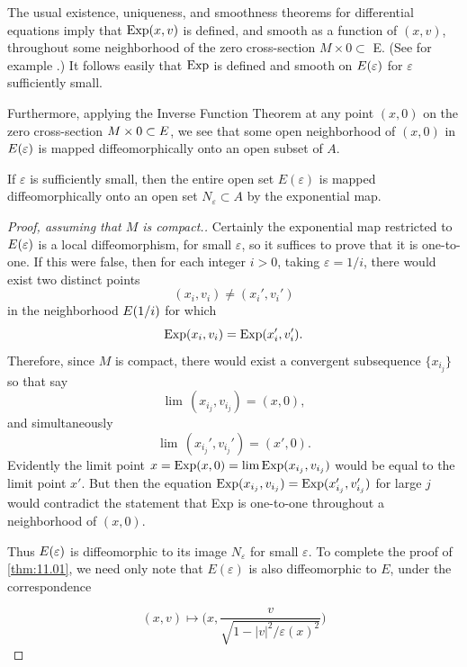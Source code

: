 \documentclass[../main]{subfiles}
\begin{document}
The usual existence, uniqueness, and smoothness theorems for differential equations imply that $\operatorname{Exp}(x, v)$ is defined, and smooth as a function of $(x, v)$, throughout some neighborhood of the zero cross-section $M \times 0 \subset$ E. (See for example \cite{bishop2011}.) It follows easily that $\operatorname{Exp}$ is defined and smooth on $E(\varepsilon)$ for $\varepsilon$ sufficiently small.

Furthermore, applying the Inverse Function Theorem at any point $(x, 0)$ on the zero cross-section $M \times 0 \subset E$, we see that some open neighborhood of $(x, 0)$ in $E(\varepsilon)$ is mapped diffeomorphically onto an open subset of $A$.


\begin{assertion*} If $\varepsilon$ is sufficiently small, then the entire open set $E(\varepsilon)$ is mapped diffeomorphically onto an open set $N_{\varepsilon} \subset A$ by the exponential map.
\end{assertion*}


\begin{proof}[Proof, assuming that $M$ is compact.] Certainly the exponential map restricted to $E(\varepsilon)$ is a local diffeomorphism, for small $\varepsilon$, so it suffices to prove that it is one-to-one. If this were false, then for each integer $i > 0$, taking $\varepsilon= 1 / i$, there would exist two distinct points
\[
(x_{i}, v_{i}) \ne (x_{i}', v_{i}')
\]
in the neighborhood $E(1 / i)$ for which
\[
\operatorname{Exp}(x_{i}, v_{i})=\operatorname{Exp}(x_{i}', v_{i}') .
\]
Therefore, since $M$ is compact, there would exist a convergent subsequence $\{x_{i_{j}}\}$ so that say
\[
\lim \,(x_{i_{j}}, v_{i_{j}})=(x, 0),
\]
and simultaneously
\[
\lim \,(x_{i_{j}}', v_{i_{j}}')=(x', 0) .
\]
Evidently the limit point $x=\operatorname{Exp}(x, 0)=\lim \operatorname{Exp}(x_{i_{j}}, v_{i_{j}})$ would be equal to the limit point $x'$. But then the equation $\operatorname{Exp}(x_{i_{j}}, v_{i_{j}})=\operatorname{Exp}(x_{i_{j}}', v_{i_{j}}')$ for large $j$ would contradict the statement that Exp is one-to-one throughout a neighborhood of $(x, 0)$.

Thus $E(\varepsilon)$ is diffeomorphic to its image $N_{\varepsilon}$ for small $\varepsilon$. To complete the proof of \ref{thm:11.01}, we need only note that $E(\varepsilon)$ is also diffeomorphic to $E$, under the correspondence

\[
(x,v) \mapsto \bigg(x, \frac{v}{\sqrt{1 - |v|^2 / \varepsilon(x)^2}}\bigg)
\]

\end{proof}
\end{document}
